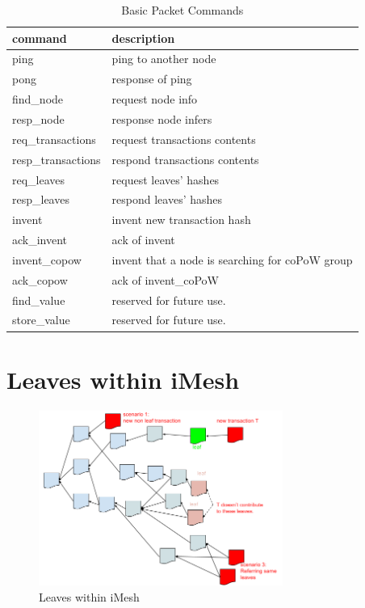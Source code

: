 \documentclass[a4paper,10pt,twocolumn]{article}
\begin{document}
 \begin{table}[htb]
	\caption{Basic Packet Commands}
    \label{tbl:cmd}
	\begin{tabularx}{\linewidth}{XX} 
		command & description \\
		\toprule
  ping & ping to another node \\
  pong & response of ping \\
  find\_node & request node info\\
    resp\_node & response node infers \\
  req\_transactions & request transactions contents \\
  resp\_transactions & respond transactions contents \\
  req\_leaves & request  leaves' hashes \\
  resp\_leaves &  respond leaves' hashes \\
  invent &  invent new transaction hash \\
  ack\_invent & ack of invent \\
  invent\_copow & invent that a node is searching for coPoW group \\
  ack\_copow & ack of invent\_coPoW \\
  find\_value &  reserved for future use.\\
  store\_value & reserved for future use.\\
  \bottomrule
\end{tabularx}
  \end{table}

\section{Leaves within iMesh}
\label{sec:leaves}

\begin{figure}[ht]
	\begin{center}
	\includegraphics[width=80mm]{leaves.png}
	  \caption{Leaves within iMesh}
    \label{fig:leaves}
	\end{center}
 \end{figure}
\end{document}
